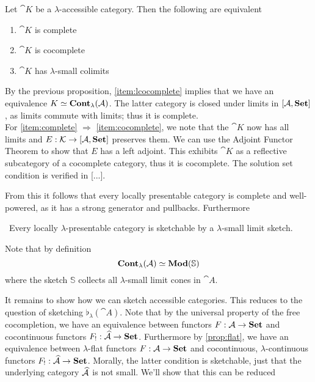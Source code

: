 \begin{Corollary}
Let $\cat K$ be a $\lambda$-accessible category. Then the following are equivalent
\begin{enumerate}
\item $\cat K$ is complete \label{item:complete}
\item $\cat K$ is cocomplete \label{item:cocomplete}
\item $\cat K$ has $\lambda$-small colimits \label{item:lcocomplete}
\end{enumerate}
\end{Corollary}
\begin{Proof}
By the previous proposition, \ref{item:lcocomplete} implies that we have an equivalence $K \simeq \mathbf{Cont}_\lambda(\mathcal{A})$. The latter category is closed under limits in $[\mathcal{A},\mathbf{Set}]$, as limits commute with limits; thus it is complete. \\

For \ref{item:complete} $\Rightarrow$ \ref{item:cocomplete}, we note that the $\cat K$ now has all limits and $E : \mathcal{K} \to [\mathcal{A},\mathbf{Set}]$ preserves them. We can use the Adjoint Functor Theorem to show that $E$ has a left adjoint. This exhibits $\cat K$ as a reflective subcategory of a cocomplete category, thus it is cocomplete. The solution set condition is verified in [...]. 
\end{Proof}

From this it follows that every locally presentable category is complete and well-powered, as it has a strong generator and pullbacks. Furthermore

\begin{Corollary}\
Every locally $\lambda$-presentable category is sketchable by a $\lambda$-small limit sketch.
\end{Corollary}
\begin{Proof}
Note that by definition
\[ \mathbf{Cont}_\lambda(\mathcal{A}) \simeq \mathbf{Mod}(\mathbb S) \]
where the sketch $\mathbb S$ collects all $\lambda$-small limit cones in $\cat A$.
\end{Proof}

It remains to show how we can sketch accessible categories. This reduces to the question of sketching $\flat_\lambda(\cat A)$. Note that by the universal property of the free cocompletion, we have an equivalence between functors $F : \mathcal{A} \to \mathbf{Set}$ and cocontinuous functors $F_! : \widehat{\mathcal{A}} \to \mathbf{Set}$. Furthermore by \ref{prop:flat}, we have an equivalence between $\lambda$-flat functors $F : \mathcal{A} \to \mathbf{Set}$ and cocontinuous, $\lambda$-continuous functors $F_! : \widehat{\mathcal{A}} \to \mathbf{Set}$. Morally, the latter condition is sketchable, just that the underlying category $\widehat{\mathcal{A}}$ is not small. We'll show that this can be reduced